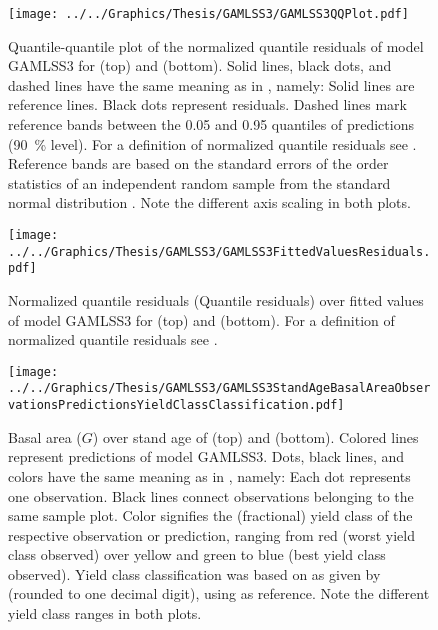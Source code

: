 \begin{figure}[h]
  \centering
  \texttt{[image: ../../Graphics/Thesis/GAMLSS3/GAMLSS3QQPlot.pdf]}
  \caption{Quantile-quantile plot of the normalized quantile residuals of model GAMLSS3 for \Beech{} (top) and \Spruce{} (bottom). Solid lines, black dots, and dashed lines have the same meaning as in , namely:  Solid lines are reference lines.  Black dots represent residuals.  Dashed lines mark reference bands between the \num{0.05} and \num{0.95} quantiles of predictions (\SI{90}{\percent} level).  For a definition of normalized quantile residuals see \textcite{Dunn1996}.  Reference bands are based on the standard errors of the order statistics of an independent random sample from the standard normal distribution \parencite{Fox2016}.  Note the different axis scaling in both plots.}
  \label{fig:GAMLSS3QQPlot}
\end{figure}

\begin{figure}[h]
  \centering
  \texttt{[image: ../../Graphics/Thesis/GAMLSS3/GAMLSS3FittedValuesResiduals.pdf]}
  \caption{Normalized quantile residuals (Quantile residuals) over fitted values of model GAMLSS3 for \Beech{} (top) and \Spruce{} (bottom).  For a definition of normalized quantile residuals see \textcite{Dunn1996}.}
  \label{fig:GAMLSS3FittedValuesResiduals}
\end{figure}

\begin{figure}[h]
  \centering
  \texttt{[image: ../../Graphics/Thesis/GAMLSS3/GAMLSS3StandAgeBasalAreaObservationsPredictionsYieldClassClassification.pdf]}
  \caption{Basal area (\(G\)) over stand age of \Beech{} (top) and \Spruce{} (bottom).  Colored lines represent predictions of model GAMLSS3.  Dots, black lines, and colors have the same meaning as in , namely:  Each dot represents one observation.  Black lines connect observations belonging to the same sample plot.  Color signifies the (fractional) yield class of the respective observation or prediction, ranging from red (worst yield class observed) over yellow and green to blue (best yield class observed).  Yield class classification was based on \ProductivityIndexText{} as given by  (rounded to one decimal digit), using  as reference.  Note the different yield class ranges in both plots.}
  \label{fig:GAMLSS3StandAgeBasalAreaObservationsPredictionsYieldClassClassification}
\end{figure}

